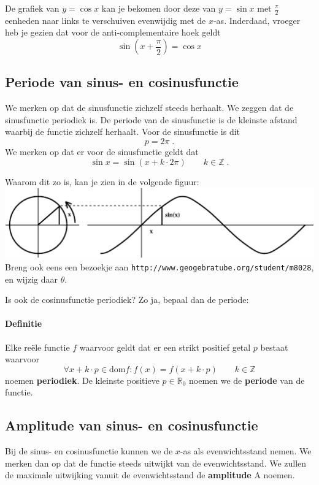 \documentclass[a4paper,12pt,twoside]{article}
\begin{document}
De grafiek van $y=\cos x$ kan je bekomen door deze van $y=\sin x$ met $\frac{\pi}{2}$ eenheden naar links te verschuiven evenwijdig met de $x$-as. Inderdaad, vroeger heb je gezien dat voor de anti-complementaire hoek geldt
$$\sin(x+\dfrac{\pi}{2})=\cos x$$

\subsection{Periode van sinus- en cosinusfunctie}

We merken op dat de sinusfunctie zichzelf steeds herhaalt. We zeggen dat de sinusfunctie periodiek is. De periode van de sinusfunctie is de kleinste afstand waarbij de functie zichzelf herhaalt. Voor de sinusfunctie is dit
$$p=2\pi\;.$$
We merken op dat er voor de sinusfunctie geldt dat
$$\sin x = \sin( x + k \cdot 2\pi ) \qquad k \in \mathbb{Z}\;.$$

Waarom dit zo is, kan je zien in de volgende figuur:\\
\includegraphics[width=\textwidth]{goniometriccircle_sine}
Breng ook eens een bezoekje aan \verb#http://www.geogebratube.org/student/m8028#, en wijzig daar $\theta$.

\begin{oefening}
Is ook de cosinusfunctie periodiek? Zo ja, bepaal dan de periode:
\end{oefening}

\paragraph{Definitie}
\begin{mdframed}
Elke reële functie $f$ waarvoor geldt dat er een strikt positief getal $p$ bestaat waarvoor
$$\forall x + k \cdot p \in \mbox{dom} f: f(x)=f( x + k \cdot p) \qquad k\in\mathbb{Z}$$
noemen {\bf periodiek}. De kleinste positieve $p \in \mathbb{R}_0$ noemen we de {\bf periode} van de functie.
\end{mdframed}

\subsection{Amplitude van sinus- en cosinusfunctie}
Bij de sinus- en cosinusfunctie kunnen we de $x$-as als evenwichtsstand nemen. We merken dan op dat de functie steeds uitwijkt van de evenwichtsstand. We zullen de maximale uitwijking vanuit de evenwichtsstand de {\bf amplitude} A noemen.
\end{document}
